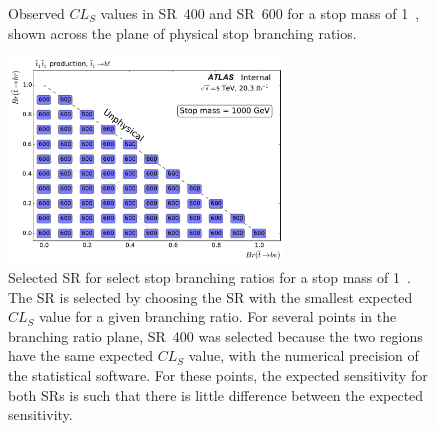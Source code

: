 \begin{figure}[ht]
  \centering
  \caption{
    Observed $CL_S$ values in SR~400 and SR~600 for a stop mass of 1~\TeV,
    shown across the plane of physical stop branching ratios.
  }
\end{figure}

\begin{figure}[ht]
  \centering
  \includegraphics[width=0.65\textwidth]
    {figs/blstop/region_selection/region_choice_vs_br_m_1000.pdf}
  \caption{
    Selected SR for select stop branching ratios for a stop mass of 1~\TeV.
    The SR is selected by choosing the SR with the smallest expected $CL_S$
    value for a given branching ratio.
    For several points in the branching ratio plane, SR~400 was selected because
    the two regions have the same expected $CL_S$ value, with the numerical
    precision of the statistical software.
    For these points, the expected sensitivity for both SRs is such that
    there is little difference between the expected sensitivity.
  }
\end{figure}


